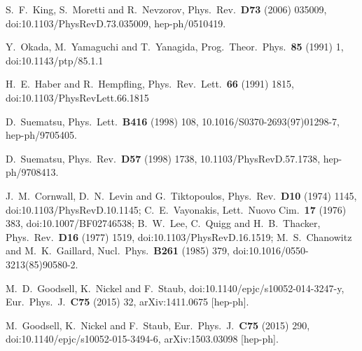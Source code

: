 \documentclass[a4paper,11pt]{article}
\begin{document}
\begin{thebibliography}{99}
S.~F.~King, S.~Moretti and R.~Nevzorov,
Phys.\ Rev.\ {\bf D73} (2006) 035009, 
doi:10.1103/PhysRevD.73.035009,
hep-ph/0510419.

  Y.~Okada, M.~Yamaguchi and T.~Yanagida,
  Prog.\ Theor.\ Phys.\  {\bf 85} (1991) 1,
  doi:10.1143/ptp/85.1.1

  H.~E.~Haber and R.~Hempfling,
  Phys.\ Rev.\ Lett.\  {\bf 66} (1991) 1815,
  doi:10.1103/PhysRevLett.66.1815

D.~Suematsu,
Phys.\ Lett.\ {\bf B416} (1998) 108, 
10.1016/S0370-2693(97)01298-7,
hep-ph/9705405.

D.~Suematsu,
Phys.\ Rev.\ {\bf D57} (1998) 1738, 
10.1103/PhysRevD.57.1738, 
hep-ph/9708413.

J.~M.~Cornwall, D.~N.~Levin and G.~Tiktopoulos,
Phys.\ Rev.\ {\bf D10} (1974) 1145,
doi:10.1103/PhysRevD.10.1145;
C.~E.~Vayonakis,
Lett.\ Nuovo Cim.\  {\bf 17} (1976) 383,
doi:10.1007/BF02746538;
B.~W.~Lee, C.~Quigg and H.~B.~Thacker,
Phys.\ Rev.\ {\bf D16} (1977) 1519,
doi:10.1103/PhysRevD.16.1519;
M.~S.~Chanowitz and M.~K.~Gaillard,
Nucl.\ Phys.\ {\bf B261} (1985) 379,
doi:10.1016/0550-3213(85)90580-2.

M.~D.~Goodsell, K.~Nickel and F.~Staub,
doi:10.1140/epjc/s10052-014-3247-y,
Eur.\ Phys.\ J.\ {\bf C75} (2015) 32, 
arXiv:1411.0675 [hep-ph].

M.~Goodsell, K.~Nickel and F.~Staub,
Eur.\ Phys.\ J.\ {\bf C75} (2015) 290,
doi:10.1140/epjc/s10052-015-3494-6,
arXiv:1503.03098 [hep-ph].


\end{thebibliography}
\end{document}
